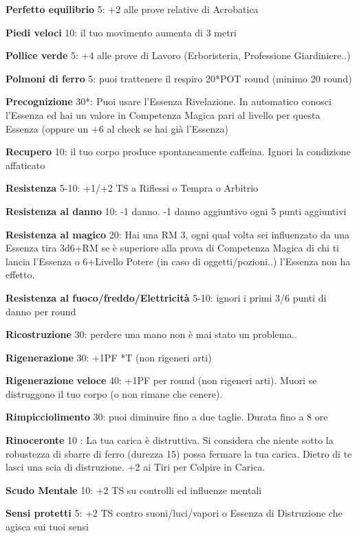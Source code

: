 \documentclass[a4paper,11pt,twoside,openany]{book}
\begin{document}
\textbf{Perfetto equilibrio} 5: +2 alle prove relative di Acrobatica

\textbf{Piedi veloci} 10: il tuo movimento aumenta di 3 metri

\textbf{Pollice verde} 5: +4 alle prove di Lavoro (Erboristeria, Professione Giardiniere..)

\textbf{Polmoni di ferro} 5: puoi trattenere il respiro 20*POT round (minimo 20 round)

\textbf{Precognizione} 30{*}: Puoi usare l'Essenza Rivelazione. In automatico conosci l'Essenza ed hai un valore in Competenza Magica pari al livello per questa Essenza (oppure un +6 al check se hai già l'Essenza)

\textbf{Recupero} 10: il tuo corpo produce spontaneamente caffeina.  Ignori la condizione affaticato

\textbf{Resistenza} 5-10: +1/+2 TS a Riflessi o Tempra o Arbitrio

\textbf{Resistenza al danno} 10: -1 danno. -1 danno aggiuntivo ogni 5 punti aggiuntivi

\textbf{Resistenza al magico} 20: Hai una RM 3, ogni qual volta sei influenzato da una Essenza tira 3d6+RM se è superiore alla prova di Competenza Magica di chi ti lancia l'Essenza o 6+Livello Potere (in caso di oggetti/pozioni..) l'Essenza non ha effetto.

\textbf{Resistenza al fuoco/freddo/Elettricità} 5-10: ignori i primi 3/6 punti di danno per round

\textbf{Ricostruzione} 30: perdere una mano non è mai stato un problema..

\textbf{Rigenerazione} 30: +1PF {*}T (non rigeneri arti)

\textbf{Rigenerazione} \textbf{veloce} 40: +1PF per round (non rigeneri arti). Muori se distruggono il tuo corpo (o non rimane che cenere).

\textbf{Rimpicciolimento} 30: puoi diminuire fino a due taglie. Durata fino a 8 ore

\textbf{Rinoceronte} 10 : La tua carica è distruttiva. Si considera che niente sotto la robustezza di sbarre di ferro (durezza 15) possa fermare la tua carica. Dietro di te lasci una scia di distruzione. +2 ai Tiri per Colpire in Carica.

\textbf{Scudo Mentale} 10: +2 TS su controlli ed influenze mentali

\textbf{Sensi protetti} 5: +2 TS contro suoni/luci/vapori o Essenza di Distruzione che agisca sui tuoi sensi
\end{document}
